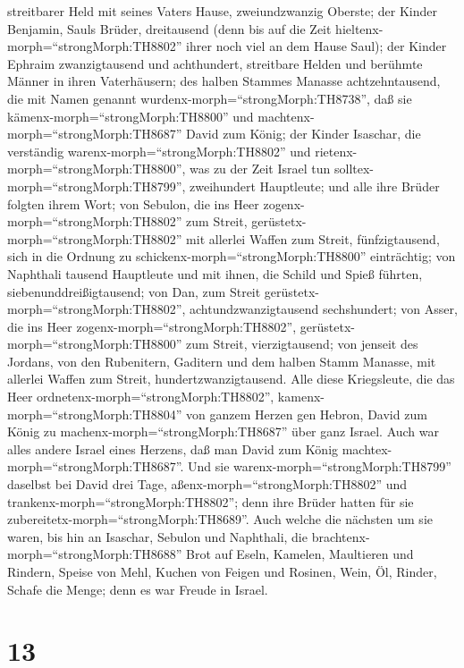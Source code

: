 streitbarer Held mit seines Vaters Hause, zweiundzwanzig Oberste;
 der Kinder Benjamin, Sauls Brüder, dreitausend (denn bis
auf die Zeit hieltenx-morph=``strongMorph:TH8802'' ihrer noch viel an
dem Hause Saul);  der Kinder Ephraim zwanzigtausend und
achthundert, streitbare Helden und berühmte Männer in ihren
Vaterhäusern;  des halben Stammes Manasse achtzehntausend,
die mit Namen genannt wurdenx-morph=``strongMorph:TH8738'', daß sie
kämenx-morph=``strongMorph:TH8800'' und
machtenx-morph=``strongMorph:TH8687'' David zum König;  der
Kinder Isaschar, die verständig warenx-morph=``strongMorph:TH8802'' und
rietenx-morph=``strongMorph:TH8800'', was zu der Zeit Israel tun
solltex-morph=``strongMorph:TH8799'', zweihundert Hauptleute; und alle
ihre Brüder folgten ihrem Wort;  von Sebulon, die ins Heer
zogenx-morph=``strongMorph:TH8802'' zum Streit,
gerüstetx-morph=``strongMorph:TH8802'' mit allerlei Waffen zum Streit,
fünfzigtausend, sich in die Ordnung zu
schickenx-morph=``strongMorph:TH8800'' einträchtig;  von
Naphthali tausend Hauptleute und mit ihnen, die Schild und Spieß
führten, siebenunddreißigtausend;  von Dan, zum Streit
gerüstetx-morph=``strongMorph:TH8802'', achtundzwanzigtausend
sechshundert;  von Asser, die ins Heer
zogenx-morph=``strongMorph:TH8802'',
gerüstetx-morph=``strongMorph:TH8800'' zum Streit, vierzigtausend;
 von jenseit des Jordans, von den Rubenitern, Gaditern und
dem halben Stamm Manasse, mit allerlei Waffen zum Streit,
hundertzwanzigtausend.  Alle diese Kriegsleute, die das
Heer ordnetenx-morph=``strongMorph:TH8802'',
kamenx-morph=``strongMorph:TH8804'' von ganzem Herzen gen Hebron, David
zum König zu machenx-morph=``strongMorph:TH8687'' über ganz Israel. Auch
war alles andere Israel eines Herzens, daß man David zum König
machtex-morph=``strongMorph:TH8687''.  Und sie
warenx-morph=``strongMorph:TH8799'' daselbst bei David drei Tage,
aßenx-morph=``strongMorph:TH8802'' und
trankenx-morph=``strongMorph:TH8802''; denn ihre Brüder hatten für sie
zubereitetx-morph=``strongMorph:TH8689''.  Auch welche die
nächsten um sie waren, bis hin an Isaschar, Sebulon und Naphthali, die
brachtenx-morph=``strongMorph:TH8688'' Brot auf Eseln, Kamelen,
Maultieren und Rindern, Speise von Mehl, Kuchen von Feigen und Rosinen,
Wein, Öl, Rinder, Schafe die Menge; denn es war Freude in Israel.

\hypertarget{section-12}{%
\section{13}\label{section-12}}

